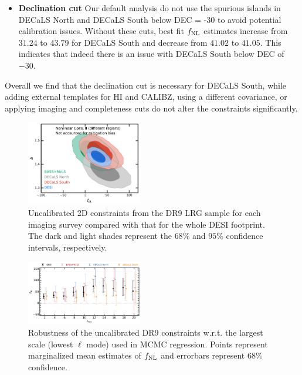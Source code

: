 \begin{itemize}
\item \textbf{Declination cut} Our default analysis do not use the spurious islands in DECaLS North and DECaLS South below DEC = -30 to avoid potential calibration issues.  Without these cuts, best fit $f_{\rm NL}$ estimates increase from $31.24$ to $43.79$ for DECaLS South and decrease from $41.02$ to $41.05$. This indicates that indeed there is an issue with DECaLS South below DEC of $-30$.

\end{itemize}

Overall we find that the declination cut is necessary for DECaLS South, while adding external templates for HI and CALIBZ, using a different covariance, or applying imaging and completeness cuts do not alter the constraints significantly.


\begin{figure}
    \centering
    \includegraphics[width=0.45\textwidth]{figures/mcmc_dr9regions.pdf} 
    \caption{Uncalibrated 2D constraints from the DR9 LRG sample for each imaging survey compared with that for the whole DESI footprint. The dark and light shades represent the $68\%$ and $95\%$ confidence intervals, respectively.}\label{fig:mcmc_dr9reg}
\end{figure}




\begin{figure}
    \centering
    \includegraphics[width=0.45\textwidth]{figures/fnl_elmin.pdf}     
    \caption{Robustness of the uncalibrated DR9 constraints w.r.t. the largest scale (lowest $\ell$ mode) used in MCMC regression. Points represent marginalized mean estimates of $f_{\rm NL}$ and errorbars represent $68$\% confidence.}\label{fig:mcmc_dr9elmin}
\end{figure}